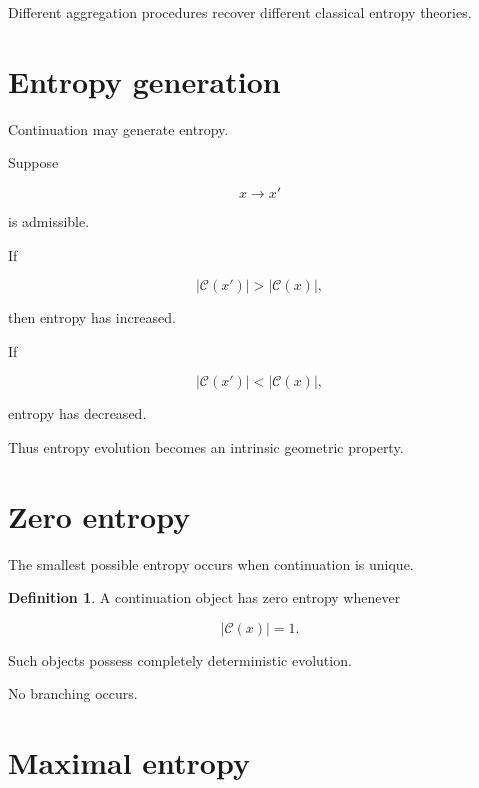 \documentclass[13pt,openany]{book}
\theoremstyle{plain}
\theoremstyle{definition}
\newtheorem{definition}{Definition}[chapter]
\begin{document}
Different aggregation procedures recover different classical entropy theories.

\section{Entropy generation}

Continuation may generate entropy.

Suppose

\[
x
\longrightarrow
x'
\]

is admissible.

If

\[
|\mathcal C(x')|
>
|\mathcal C(x)|,
\]

then entropy has increased.

If

\[
|\mathcal C(x')|
<
|\mathcal C(x)|,
\]

entropy has decreased.

Thus entropy evolution becomes an intrinsic geometric property.

\section{Zero entropy}

The smallest possible entropy occurs when continuation is unique.

\begin{definition}

A continuation object has zero entropy whenever

\[
|\mathcal C(x)|=1.
\]

\end{definition}

Such objects possess completely deterministic evolution.

No branching occurs.

\section{Maximal entropy}
\end{document}
